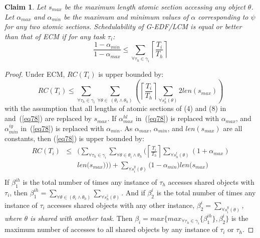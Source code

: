 \documentclass[conference]{IEEEtran}
\newtheorem{clm}{Claim}
\begin{document}
\begin{clm}\label{lcm versus ecm}
Let $s_{max}$ be the maximum length atomic section accessing any object $\theta$. Let $\alpha_{max}$ and $\alpha_{min}$ be the maximum and minimum values of $\alpha$ corresponding to $\psi$ for any two atomic sections.  Schedulability of G-EDF/LCM is equal or better than that of  ECM if for any task $\tau_i$:
\begin{equation}
\frac{1-\alpha_{min}}{1-\alpha_{max}} \le \sum_{\forall \tau_h \in \gamma_i}\left\lceil\frac{T_i}{T_h}\right\rceil
\label{edf-lcm-ecm}\end{equation}
\end{clm}
\begin{proof}
Under ECM, $RC(T_{i})$ is upper bounded by:
\begin{equation}
RC(T_{i})\le\sum_{\forall \tau_{h}\in\gamma_{i}}\sum_{\forall \theta\in\ (\theta_{i}\wedge\theta_{h})}\left(\left\lceil\frac{T_{i}}{T_{h}}\right\rceil\sum_{\forall s_{h}^{z}(\theta)}2len(s_{max})\right)\label{eq61}\end{equation}
with the assumption that all lengths of atomic sections of (4) and (8) in~\cite{stmconcurrencycontrol:emsoft11} and~(\ref{eq78}) are replaced by $s_{max}$.
If $\alpha_{max}^{hl}$ in~(\ref{eq78}) is replaced with $\alpha_{max}$, and $\alpha_{min}^{iy}$ in~(\ref{eq78}) is replaced with $\alpha_{min}$. As $\alpha_{max}$, $\alpha_{min}$, and $len(s_{max})$ are all constants, then (\ref{eq78}) is upper bounded by:
\begin{eqnarray}
RC(T_i) & \le & \Bigg(\sum_{\forall \tau_h \in \gamma_i}\sum_{\forall\theta \in \theta_i \wedge \theta_h}\Bigg(\left\lceil\frac{T_{i}}{T_{h}}\right\rceil\sum_{\forall s_{h}^{l}(\theta)}\left(1+\alpha_{max}\right)\nonumber\\
& & len\Big(s_{max}\Big)\Bigg)\Bigg)
 +  \sum_{\forall s_{i}^{y}(\theta)}\Big(1-\alpha_{min}\Big)len\Big(s_{max}\Big)\nonumber\\ 
\label{eq101}\end{eqnarray}
%
If $\beta_1^{ih}$ is the total number of times any instance of $\tau_h$ accesses shared objects with $\tau_i$, then $\beta_1^{ih}=\sum_{\forall \theta\in(\theta_{i}\wedge\theta_{h})}\sum_{\forall s_{h}^{z}(\theta)}$. And if $\beta_2^i$ is the total number of times any instance of $\tau_i$ accesses shared objects with any other instance,   $\beta_2^i=\sum_{\forall s_{i}^{y}(\theta)}$\textit{, where $\theta$ is shared with another task}. Then $\beta_{i}=max\{max_{\forall \tau_h \in \gamma_i}\{\beta_1^{ih}\},\beta_2^i\}$ is the maximum number of accesses to all shared objects by any instance of $\tau_{i}$ or $\tau_{h}$. 

\end{proof}
\end{document}
